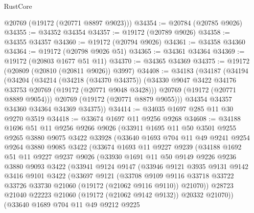 \begin{lexlean}{RustCore}
\begin{coremodule}
      @20769
      (@19172 (@20771 @8897 @9023)))
@34354 := @20784 (@20785 @9026)
@34355 := @34352 @34354
@34357 := @19172 (@20789 @9026)
@34358 := @34355 @34357
@34360 := @19172 (@20794 @9026)
@34361 := @34358 @34360
@34364 := @19172 (@20798 @9026 @51)
@34365 := @34361 @34364
@34369 := @19172 (@20803 @1677 @51 @11)
@34370 := @34365 @34369
@34375 := @19172 (@20809 (@20810 (@20811 @9026)) @3997)
@34408 := @34183
    (@34187
      (@34194
        (@34204
          (@34214
            (@34218 (@34370 @34375))
            (@34330 @9047 @3422 @34176 @33753 @20769 (@19172 (@20771 @9048 @3428)))
            @20769
            (@19172 (@20771 @8889 @9054)))
          @20769
          (@19172 (@20771 @8879 @9055)))
        @34354
        @34357
        @34360
        @34364
        @34369
        @34375))
@34414 := @34035 @1697 @285 @11 @30 @9270 @3519
@34418 := @33674 @1697 @11 @9256 @9268
@34608 := @34188
    @1696
    @51
    @11
    @9256
    @9266
    @9026
    (@33911
      @1695
      @11
      @50
      @3501
      @9255
      @9265
      @3880
      @9075
      @3422
      @33928
      (@33640
        @1693
        @704
        @11
        @49
        @9241
        @9254
        @9264
        @3880
        @9085
        @3422
        (@33674
          @1693
          @11
          @9227
          @9239
          (@34188
            @1692
            @51
            @11
            @9227
            @9237
            @9026
            (@33930
              @1691
              @11
              @50
              @9149
              @9226
              @9236
              @3880
              @9093
              @3422
              (@33941
                @9124
                @9147
                (@33946
                  @9121
                  @3935
                  @9131
                  @9142
                  @3416
                  @9101
                  @3422
                  (@33697
                    @9121
                    (@33708
                      @9109
                      @9116
                      @33718
                      @33722
                      @33726
                      @33730
                      @21060
                      (@19172 (@21062 @9116 @9110))
                      @21070))
                  @28723
                  @21040
                  @22223
                  @21060
                  (@19172 (@21062 @9142 @9132))
                  @20332
                  @21070))
              (@33640
                @1689
                @704
                @11
                @49
                @9212
                @9225

\end{coremodule}
\end{lexlean}
